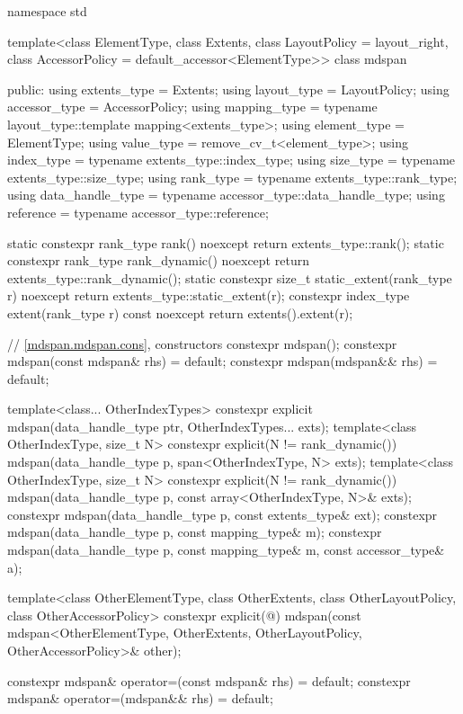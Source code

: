 \begin{codeblock}
namespace std {
  template<class ElementType, class Extents, class LayoutPolicy = layout_right,
           class AccessorPolicy = default_accessor<ElementType>>
  class mdspan {
  public:
    using extents_type = Extents;
    using layout_type = LayoutPolicy;
    using accessor_type = AccessorPolicy;
    using mapping_type = typename layout_type::template mapping<extents_type>;
    using element_type = ElementType;
    using value_type = remove_cv_t<element_type>;
    using index_type = typename extents_type::index_type;
    using size_type = typename extents_type::size_type;
    using rank_type = typename extents_type::rank_type;
    using data_handle_type = typename accessor_type::data_handle_type;
    using reference = typename accessor_type::reference;

    static constexpr rank_type rank() noexcept { return extents_type::rank(); }
    static constexpr rank_type rank_dynamic() noexcept { return extents_type::rank_dynamic(); }
    static constexpr size_t static_extent(rank_type r) noexcept
      { return extents_type::static_extent(r); }
    constexpr index_type extent(rank_type r) const noexcept { return extents().extent(r); }

    // \ref{mdspan.mdspan.cons}, constructors
    constexpr mdspan();
    constexpr mdspan(const mdspan& rhs) = default;
    constexpr mdspan(mdspan&& rhs) = default;

    template<class... OtherIndexTypes>
      constexpr explicit mdspan(data_handle_type ptr, OtherIndexTypes... exts);
    template<class OtherIndexType, size_t N>
      constexpr explicit(N != rank_dynamic())
        mdspan(data_handle_type p, span<OtherIndexType, N> exts);
    template<class OtherIndexType, size_t N>
      constexpr explicit(N != rank_dynamic())
        mdspan(data_handle_type p, const array<OtherIndexType, N>& exts);
    constexpr mdspan(data_handle_type p, const extents_type& ext);
    constexpr mdspan(data_handle_type p, const mapping_type& m);
    constexpr mdspan(data_handle_type p, const mapping_type& m, const accessor_type& a);

    template<class OtherElementType, class OtherExtents,
             class OtherLayoutPolicy, class OtherAccessorPolicy>
      constexpr explicit(@\seebelow@)
        mdspan(const mdspan<OtherElementType, OtherExtents,
                            OtherLayoutPolicy, OtherAccessorPolicy>& other);

    constexpr mdspan& operator=(const mdspan& rhs) = default;
    constexpr mdspan& operator=(mdspan&& rhs) = default;

}}
\end{codeblock}
